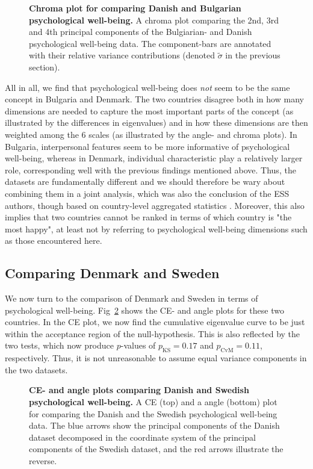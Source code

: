 \documentclass[a4paper,14pt]{article}
\begin{document}
\begin{figure}[!h]
\caption{{\bf Chroma plot for comparing Danish and Bulgarian psychological well-being.} A chroma plot comparing the 2nd, 3rd and 4th principal components of the Bulgiarian- and Danish psychological well-being data. The component-bars are annotated with their relative variance contributions (denoted $\tilde\sigma$ in the previous section).}
\label{plotBG.pancake}
\end{figure}

All in all, we find that psychological well-being does \textit{not} seem to be the same concept in Bulgaria and Denmark. The two countries disagree both in how many dimensions are needed to capture the most important parts of the concept (as illustrated by the differences in eigenvalues) and in how these dimensions are then weighted among the 6 scales (as illustrated by the angle- and chroma plots). In Bulgaria, interpersonal features seem to be more informative of psychological well-being, whereas in Denmark, individual characteristic play a relatively larger role, corresponding well with the previous findings mentioned above. Thus, the datasets are fundamentally different and we should therefore be wary about combining them in a joint analysis, which was also the conclusion of the ESS authors, though based on country-level aggregated statistics \cite{ESStopline5}. Moreover, this also implies that two countries cannot be ranked in terms of which country is "the most happy", at least not by referring to psychological well-being dimensions such as those encountered here.

\subsection*{Comparing Denmark and Sweden}
We now turn to the comparison of Denmark and Sweden in terms of psychological well-being. Fig~\ref{plotSE.cehair} shows the CE- and angle plots for these two countries. In the CE plot, we now find the cumulative eigenvalue curve to be just within the acceptance region of the null-hypothesis. This is also reflected by the two tests, which now produce $p$-values of $p_\text{KS} = 0.17$ and $p_\text{CvM} = 0.11$, respectively. Thus, it is not unreasonable to assume equal variance components in the two datasets.

\begin{figure}[!h]
\caption{{\bf CE- and angle plots comparing Danish and Swedish psychological well-being.} A CE (top) and a angle (bottom) plot for comparing the Danish and the Swedish psychological well-being data. The blue arrows show the principal components of the Danish dataset decomposed in the coordinate system of the principal components of the Swedish dataset, and the red arrows illustrate the reverse.}
\label{plotSE.cehair}
\end{figure}
\end{document}
